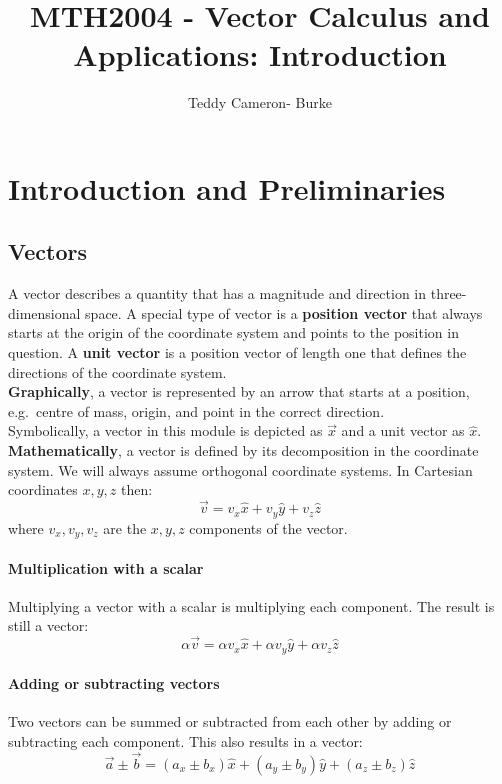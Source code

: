 \documentclass[11pt]{article}
\title{MTH2004 - Vector Calculus and Applications: Introduction}
\author{Teddy Cameron- Burke}
\begin{document}
\maketitle
\section{Introduction and Preliminaries}\label{sec:introduction-and-preliminaries}
\subsection{Vectors}\label{subsec:vectors}
A vector describes a quantity that has a magnitude and direction in three-dimensional space.
A special type of vector is a \textbf{position vector} that always starts at the origin of the coordinate system and points to the position in question.
A \textbf{unit vector} is a position vector of length one that defines the directions of the coordinate system.\\
\textbf{Graphically}, a vector is represented by an arrow that starts at a position, e.g.\ centre of mass, origin, and point in the correct direction.\\
Symbolically, a vector in this module is depicted as $\vec{x}$ and a unit vector as $\hat{x}$.\\
\textbf{Mathematically}, a vector is defined by its decomposition in the coordinate system.
We will always assume orthogonal coordinate systems.
In Cartesian coordinates $x,y,z$ then:
   \begin{equation}
       \vec{v} = v_{x}\hat{x} + v_y\hat{y} + v_z\hat{z}\label{eq:equation} 
   \end{equation}
where $v_x, v_y, v_z$ are the $x, y, z$ components of the vector.\\
\paragraph{Multiplication with a scalar}
Multiplying a vector with a scalar is multiplying each component.
The result is still a vector:
    \begin{equation}
        \label{eq:equation2}
        \alpha \vec{v} = \alpha v_x \hat{x} + \alpha v_y \hat{y} + \alpha v_z \hat{z}
    \end{equation}
\paragraph{Adding or subtracting vectors}
Two vectors can be summed or subtracted from each other by adding or subtracting each component.
This also results in a vector:
    \begin{equation}
        \label{eq:equation3}
        \vec{a} \pm \vec{b} = (a_x \pm b_x)\hat{x} + (a_y \pm b_y)\hat{y} + (a_z \pm b_z)\hat{z}
    \end{equation}
\end{document}
